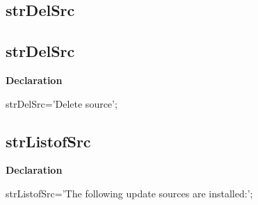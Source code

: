 \documentclass{report}
\newif\ifpdf
\begin{document}
\subsection*{\large{\textbf{strDelSrc}}\normalsize\hspace{1ex}\hrulefill}
\else
\subsection*{strDelSrc}
\fi
\label{trstrings-strDelSrc}
\begin{list}{}{
\setlength{\itemindent}{0cm}
\setlength{\listparindent}{0cm}
\setlength{\leftmargin}{\evensidemargin}
\addtolength{\leftmargin}{\tmplength}
\settowidth{\labelsep}{X}
\addtolength{\leftmargin}{\labelsep}
\setlength{\labelwidth}{\tmplength}
}
\item[\textbf{Declaration}\hfill]
\ifpdf
\begin{flushleft}
\fi
\begin{ttfamily}
strDelSrc='Delete source';\end{ttfamily}

\ifpdf
\end{flushleft}
\fi

\end{list}
\ifpdf
\subsection*{\large{\textbf{strListofSrc}}\normalsize\hspace{1ex}\hrulefill}
\else
\subsection*{strListofSrc}
\fi
\label{trstrings-strListofSrc}
\begin{list}{}{
\setlength{\itemindent}{0cm}
\setlength{\listparindent}{0cm}
\setlength{\leftmargin}{\evensidemargin}
\addtolength{\leftmargin}{\tmplength}
\settowidth{\labelsep}{X}
\addtolength{\leftmargin}{\labelsep}
\setlength{\labelwidth}{\tmplength}
}
\item[\textbf{Declaration}\hfill]
\ifpdf
\begin{flushleft}
\fi
\begin{ttfamily}
strListofSrc='The following update sources are installed:';\end{ttfamily}

\ifpdf
\end{flushleft}
\fi

\end{list}
\ifpdf
\end{document}

